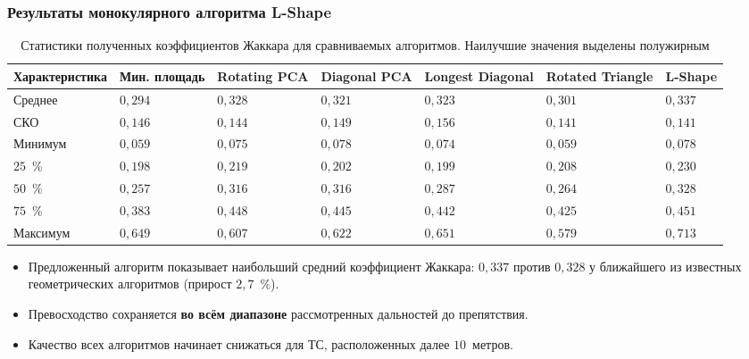 \begin{frame}[noframenumbering]
	\frametitle{Результаты монокулярного алгоритма L-Shape}
		\begin{table}
			\footnotesize
			\centering
			\begin{tabular}{|p{}|p{0.09\textwidth}|p{}|p{}|p{}|p{}|p{}|}
				\hline
				\textbf{Характе\-ристика} & \textbf{Мин. площадь} & \textbf{Rotating PCA} & \textbf{Diagonal PCA} & \textbf{Longest Diagonal} & \textbf{Rotated Triangle} & \textbf{L-Shape}\\
				\hline
				Среднее & $0,294$ & $0,328$ & $0,321$ & $0,323$ & $0,301$ & \boldmath$0,337$ \\
				\hline
				\tiny СКО & $0,146$ & $0,144$ & $0,149$ & $0,156$ & $0,141$ & $0,141$ \\
				\hline
				Минимум & $0,059$  & $0,075$ & \boldmath$0,078$ & $0,074$ & $0,059$ & \boldmath$0,078$\\
				\hline
				$25$~\% & $0,198$ & $0,219$ & $0,202$ &$0,199$ & $0,208$ & \boldmath$0,230$ \\
				\hline
				$50$~\% & $0,257$ & $0,316$ & $0,316$ & $0,287$ & $0,264$ & \boldmath$0,328$ \\
				\hline
				$75$~\% & $0,383$ & $0,448$ & $0,445$ & $0,442$ & $0,425$ & \boldmath$0,451$ \\
				\hline
				Максимум & $0,649$ & $0,607$ & $0,622$ & $0,651$ & $0,579$ & \boldmath$0,713$ \\
				\hline
			\end{tabular}
			\caption{\fontsize{6}{7}\selectfont Статистики полученных коэффициентов Жаккара для сравниваемых алгоритмов. Наилучшие значения выделены полужирным}
		\end{table}

	\vspace{-0.7em}
	\footnotesize
	\begin{itemize}
		\item Предложенный алгоритм показывает наибольший средний коэффициент Жаккара: $0,337$ против $0,328$ у ближайшего из известных геометрических алгоритмов (прирост $2,7$~\%).
		\item Превосходство сохраняется \textbf{во всём диапазоне} рассмотренных дальностей до препятствия.
		\item Качество всех алгоритмов начинает снижаться для ТС, расположенных далее $10$~метров.
	\end{itemize}
\end{frame}

